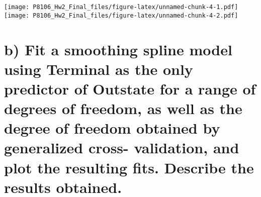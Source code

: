 \documentclass[]{article}
\newenvironment{Shaded}{\begin{snugshade}}{\end{snugshade}}
\newcommand{\DataTypeTok}[1]{\textcolor[rgb]{0.13,0.29,0.53}{#1}}
\newcommand{\DecValTok}[1]{\textcolor[rgb]{0.00,0.00,0.81}{#1}}
\newcommand{\FloatTok}[1]{\textcolor[rgb]{0.00,0.00,0.81}{#1}}
\newcommand{\KeywordTok}[1]{\textcolor[rgb]{0.13,0.29,0.53}{\textbf{#1}}}
\newcommand{\NormalTok}[1]{#1}
\newcommand{\OperatorTok}[1]{\textcolor[rgb]{0.81,0.36,0.00}{\textbf{#1}}}
\newcommand{\StringTok}[1]{\textcolor[rgb]{0.31,0.60,0.02}{#1}}
\begin{document}
\begin{Shaded}
\end{Shaded}

\texttt{[image: P8106\_Hw2\_Final\_files/figure-latex/unnamed-chunk-4-1.pdf]}
\texttt{[image: P8106\_Hw2\_Final\_files/figure-latex/unnamed-chunk-4-2.pdf]}

\hypertarget{b-fit-a-smoothing-spline-model-using-terminal-as-the-only-predictor-of-outstate-for-a-range-of-degrees-of-freedom-as-well-as-the-degree-of-freedom-obtained-by-generalized-cross--validation-and-plot-the-resulting-fits.-describe-the-results-obtained.}{%
\section{b) Fit a smoothing spline model using Terminal as the only
predictor of Outstate for a range of degrees of freedom, as well as the
degree of freedom obtained by generalized cross- validation, and plot
the resulting fits. Describe the results
obtained.}\label{b-fit-a-smoothing-spline-model-using-terminal-as-the-only-predictor-of-outstate-for-a-range-of-degrees-of-freedom-as-well-as-the-degree-of-freedom-obtained-by-generalized-cross--validation-and-plot-the-resulting-fits.-describe-the-results-obtained.}}
\end{document}
